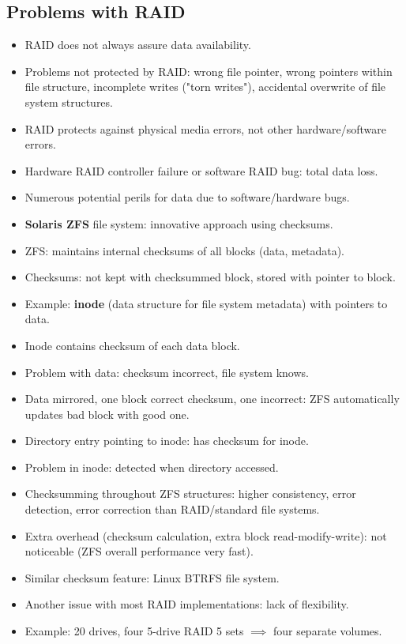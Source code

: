 \subsection{Problems with RAID}
\begin{itemize}
    \item RAID does not always assure data availability.
    \item Problems not protected by RAID: wrong file pointer, wrong pointers within file structure, incomplete writes ("torn writes"), accidental overwrite of file system structures.
    \item RAID protects against physical media errors, not other hardware/software errors.
    \item Hardware RAID controller failure or software RAID bug: total data loss.
    \item Numerous potential perils for data due to software/hardware bugs.
    \item \textbf{Solaris ZFS} file system: innovative approach using checksums.
    \item ZFS: maintains internal checksums of all blocks (data, metadata).
    \item Checksums: not kept with checksummed block, stored with pointer to block.
    \item Example: \textbf{inode} (data structure for file system metadata) with pointers to data.
    \item Inode contains checksum of each data block.
    \item Problem with data: checksum incorrect, file system knows.
    \item Data mirrored, one block correct checksum, one incorrect: ZFS automatically updates bad block with good one.
    \item Directory entry pointing to inode: has checksum for inode.
    \item Problem in inode: detected when directory accessed.
    \item Checksumming throughout ZFS structures: higher consistency, error detection, error correction than RAID/standard file systems.
    \item Extra overhead (checksum calculation, extra block read-modify-write): not noticeable (ZFS overall performance very fast).
    \item Similar checksum feature: Linux BTRFS file system.
    \item Another issue with most RAID implementations: lack of flexibility.
    \item Example: 20 drives, four 5-drive RAID 5 sets $\implies$ four separate volumes.

\end{itemize}
